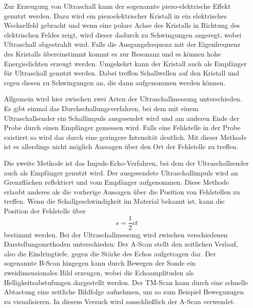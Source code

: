     Zur Erzeugung von Ultraschall kann der sogenannte piezo-elektrische Effekt 
    genutzt werden. Dazu wird ein piezoelektrischer Kristall in ein elektrisches 
    Wechselfeld gebracht und wenn eine polare Achse des Kristalls in Richtung 
    des elektrischen Feldes zeigt, wird dieser dadurch zu Schwingungen angeregt,
    wobei Ultraschall abgestrahlt wird. Falls die Ausgangsfrequenz mit der 
    Eigenfrequenz des Kristalls übereinstimmt kommt es zur Resonanz und es können
    hohe Energiedichten erzeugt werden. Umgekehrt kann der Kristall auch als 
    Empfänger für Ultraschall genutzt werden. Dabei treffen Schallwellen auf den 
    Kristall und regen diesen zu Schwingungen an, die dann aufgenommen werden 
    können. 


    Allgemein wird hier zwischen zwei Arten der Ultraschallmessung unterschieden.
    Es gibt einmal das Durchschallungsverfahren, bei dem mit einem 
    Ultraschallsender ein Schallimpuls ausgesendet wird und am anderen 
    Ende der Probe durch einen Empfänger gemessen wird. Falls eine Fehlstelle
    in der Probe existiert so wird das durch eine geringere Intensität deutlich.
    Mit dieser Methode ist es allerdings nicht möglich Aussagen über 
    den Ort der Fehlstelle zu treffen.


    Die zweite Methode ist das Impuls-Echo-Verfahren, bei dem 
    der Ultraschallsender auch als Empfänger genutzt wird. 
    Der ausgesendete Ultraschallimpuls wird an Grenzflächen reflektiert
    und vom Empfänger aufgenommen. Diese Methode erlaubt anderes als die vorherige 
    Aussagen über die Position von Fehlstellen zu treffen.
    Wenn die Schallgeschwindigkeit im Material bekannt ist, kann die Position der 
    Fehlstelle über 
    \begin{equation}
    \label{eqn:fehlstelle}
        s=\frac{1}{2} c t
    \end{equation}
    bestimmt werden.
    Bei der Ultraschallmessung wird zwischen verschiedenen Darstellungsmethoden unterschieden:
    Der A-Scan stellt den zeitlichen Verlauf, also die Eindringtiefe, gegen die Stärke des Echos aufgetragen dar.
    Der sogenannte B-Scan hingegen kann durch Bewegen der Sonde ein zweidimensionales Bild erzeugen, wobei die Echoamplituden als Helligkeitsabstufungen
    dargestellt werden. Der TM-Scan kann durch eine schnelle Abtastung eine zeitliche Bildfolge aufnehmen, um so zum Beispiel Bewegunugen zu visualisieren.
    In diesem Versuch wird ausschließlich der A-Scan verwendet.